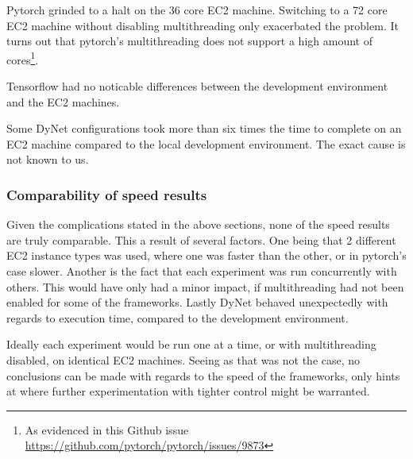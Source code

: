 Pytorch grinded to a halt on the 36 core EC2 machine. Switching to a 72 core EC2
machine without disabling multithreading only exacerbated the problem. It turns
out that pytorch's multithreading does not support a high amount of
cores\footnote{As evidenced in this Github issue \url{https://github.com/pytorch/pytorch/issues/9873}}.

Tensorflow had no noticable differences between the development environment and
the EC2 machines.

Some DyNet configurations took more than six times the time to complete on an
EC2 machine compared to the local development environment. The exact cause is
not known to us.

\subsubsection{Comparability of speed results}

Given the complications stated in the above sections, none of the speed results
are truly comparable. This a result of several factors.
One being that 2 different EC2 instance types was used, where one was faster
than the other, or in pytorch's case slower.
Another is the fact that each experiment was run concurrently with others. This
would have only had a minor impact, if multithreading had not been enabled for
some of the frameworks.
Lastly DyNet behaved unexpectedly with regards to execution time, compared to the
development environment.

Ideally each experiment would be run one at a time, or with multithreading
disabled, on identical EC2 machines. Seeing as that was not the case, no
conclusions can be made with regards to the speed of the frameworks, only hints
at where further experimentation with tighter control might be warranted.
